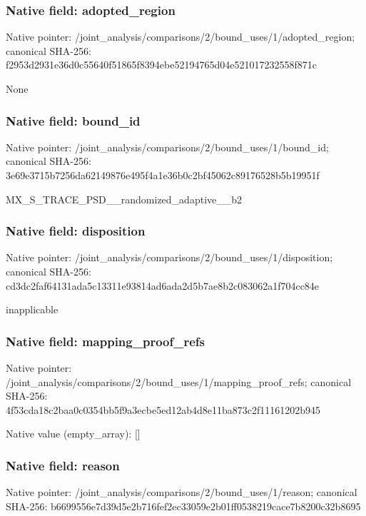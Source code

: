 \documentclass[10pt,a4paper]{article}
\begin{document}
\subsubsection{Native field: adopted\_\allowbreak{}region}
Native pointer: /joint\_\allowbreak{}analysis/comparisons/2/bound\_\allowbreak{}uses/1/adopted\_\allowbreak{}region; canonical SHA-256: f2953d2931e36d0c55640f51865f8394ebe52194765d04e521017232558f871c

\begingroup\raggedright\sloppy None\par\endgroup

\subsubsection{Native field: bound\_\allowbreak{}id}
Native pointer: /joint\_\allowbreak{}analysis/comparisons/2/bound\_\allowbreak{}uses/1/bound\_\allowbreak{}id; canonical SHA-256: 3e69e3715b7256da62149876e495f4a1e36b0c2bf45062c89176528b5b19951f

\begingroup\raggedright\sloppy MX\_\allowbreak{}S\_\allowbreak{}TRACE\_\allowbreak{}PSD\_\allowbreak{}\_\allowbreak{}randomized\_\allowbreak{}adaptive\_\allowbreak{}\_\allowbreak{}b2\par\endgroup

\subsubsection{Native field: disposition}
Native pointer: /joint\_\allowbreak{}analysis/comparisons/2/bound\_\allowbreak{}uses/1/disposition; canonical SHA-256: cd3dc2faf64131ada5c13311e93814ad6ada2d5b7ae8b2c083062a1f704cc84e

\begingroup\raggedright\sloppy inapplicable\par\endgroup

\subsubsection{Native field: mapping\_\allowbreak{}proof\_\allowbreak{}refs}
Native pointer: /joint\_\allowbreak{}analysis/comparisons/2/bound\_\allowbreak{}uses/1/mapping\_\allowbreak{}proof\_\allowbreak{}refs; canonical SHA-256: 4f53cda18c2baa0c0354bb5f9a3ecbe5ed12ab4d8e11ba873c2f11161202b945

Native value (empty\_\allowbreak{}array): []

\subsubsection{Native field: reason}
Native pointer: /joint\_\allowbreak{}analysis/comparisons/2/bound\_\allowbreak{}uses/1/reason; canonical SHA-256: b6699556e7d39d5e2b716fef2ec33059e2b01ff0538219cace7b8200c32b8695
\end{document}

